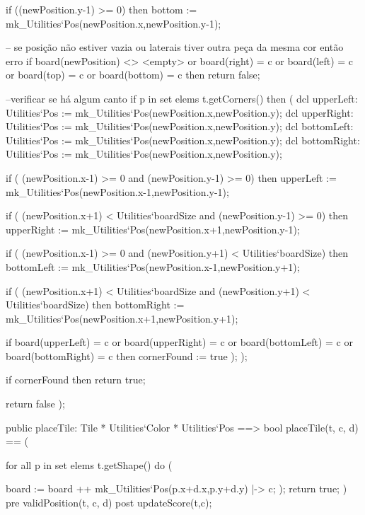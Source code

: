 \begin{vdm_al}
           if ((newPosition.y-1) >= 0) then
            bottom := mk_Utilities`Pos(newPosition.x,newPosition.y-1);

           -- se posição não estiver vazia ou laterais tiver outra peça da mesma cor então erro
           if board(newPosition) <> <empty> or board(right) = c or board(left) = c
       or board(top) = c or board(bottom) = c then
            return false;
           
           --verificar se há algum canto
           if p in set elems t.getCorners() then (
            dcl upperLeft: Utilities`Pos := mk_Utilities`Pos(newPosition.x,newPosition.y);
            dcl upperRight: Utilities`Pos := mk_Utilities`Pos(newPosition.x,newPosition.y);           
            dcl bottomLeft: Utilities`Pos := mk_Utilities`Pos(newPosition.x,newPosition.y);
            dcl bottomRight: Utilities`Pos := mk_Utilities`Pos(newPosition.x,newPosition.y);
            
            if ( (newPosition.x-1) >= 0 and (newPosition.y-1) >= 0) then
             upperLeft := mk_Utilities`Pos(newPosition.x-1,newPosition.y-1);
            
            if ( (newPosition.x+1)  < Utilities`boardSize and (newPosition.y-1) >= 0) then
             upperRight := mk_Utilities`Pos(newPosition.x+1,newPosition.y-1);
             
            if ( (newPosition.x-1) >= 0 and (newPosition.y+1) < Utilities`boardSize) then           
             bottomLeft := mk_Utilities`Pos(newPosition.x-1,newPosition.y+1);
             
            if ( (newPosition.x+1)  < Utilities`boardSize
       and (newPosition.y+1)  < Utilities`boardSize) then
             bottomRight := mk_Utilities`Pos(newPosition.x+1,newPosition.y+1);
            
            if board(upperLeft) = c or board(upperRight) = c or board(bottomLeft) = c
       or board(bottomRight) = c then
             cornerFound := true
        );
          );
          
          if cornerFound then
              return true;
              
             return false
         );
        
        public placeTile: Tile * Utilities`Color * Utilities`Pos ==> bool
      placeTile(t, c, d) == (
       
          for all p in set elems t.getShape() do (
            
           board := board ++ {mk_Utilities`Pos(p.x+d.x,p.y+d.y) |-> c};
          );
       return true;
      )
      pre validPosition(t, c, d)
      post updateScore(t,c);
      

\end{vdm_al}
